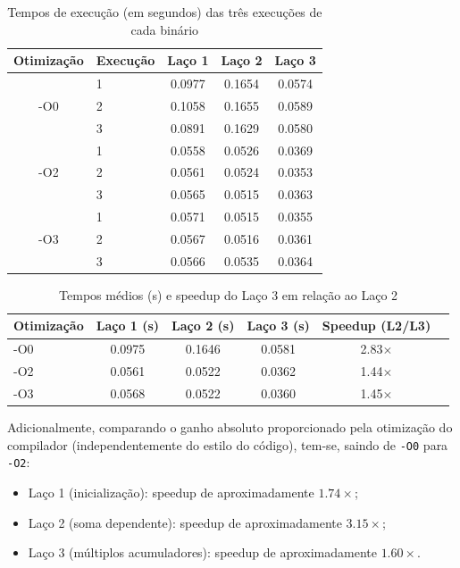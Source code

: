 \documentclass[a4paper,12pt]{article}
\begin{document}
\begin{table}[h]
\centering
\caption{Tempos de execução (em segundos) das três execuções de cada binário}
\label{tab:execucoes}
\begin{tabular}{@{}clccc@{}}
\toprule
\textbf{Otimização} & \textbf{Execução} & \textbf{Laço 1} & \textbf{Laço 2} & \textbf{Laço 3} \\
\midrule
\multirow{3}{*}{-O0}
 & 1 & 0.0977 & 0.1654 & 0.0574 \\
 & 2 & 0.1058 & 0.1655 & 0.0589 \\
 & 3 & 0.0891 & 0.1629 & 0.0580 \\
\midrule
\multirow{3}{*}{-O2}
 & 1 & 0.0558 & 0.0526 & 0.0369 \\
 & 2 & 0.0561 & 0.0524 & 0.0353 \\
 & 3 & 0.0565 & 0.0515 & 0.0363 \\
\midrule
\multirow{3}{*}{-O3}
 & 1 & 0.0571 & 0.0515 & 0.0355 \\
 & 2 & 0.0567 & 0.0516 & 0.0361 \\
 & 3 & 0.0566 & 0.0535 & 0.0364 \\
\bottomrule
\end{tabular}
\end{table}

\begin{table}[h]
\centering
\caption{Tempos médios (s) e speedup do Laço 3 em relação ao Laço 2}
\label{tab:medias}
\begin{tabular}{@{}lccccc@{}}
\toprule
\textbf{Otimização} & \textbf{Laço 1 (s)} & \textbf{Laço 2 (s)} & \textbf{Laço 3 (s)} & \textbf{Speedup (L2/L3)} \\
\midrule
-O0 & 0.0975 & 0.1646 & 0.0581 & 2.83$\times$ \\
-O2 & 0.0561 & 0.0522 & 0.0362 & 1.44$\times$ \\
-O3 & 0.0568 & 0.0522 & 0.0360 & 1.45$\times$ \\
\bottomrule
\end{tabular}
\end{table}

Adicionalmente, comparando o ganho absoluto proporcionado pela otimização do compilador (independentemente do estilo do código), tem-se, saindo de \texttt{-O0} para \texttt{-O2}:

\begin{itemize}
    \item Laço 1 (inicialização): speedup de aproximadamente $1.74\times$;
    \item Laço 2 (soma dependente): speedup de aproximadamente $3.15\times$;
    \item Laço 3 (múltiplos acumuladores): speedup de aproximadamente $1.60\times$.
\end{itemize}
\end{document}

